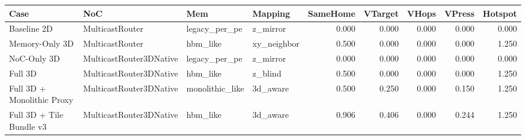\begin{tabular}{l l l l r r r r r}
\hline
Case & NoC & Mem & Mapping & SameHome & VTarget & VHops & VPress & Hotspot \\
\hline
Baseline 2D & MulticastRouter & legacy\_per\_pe & z\_mirror & 0.000 & 0.000 & 0.000 & 0.000 & 0.000 \\
Memory-Only 3D & MulticastRouter & hbm\_like & xy\_neighbor & 0.500 & 0.000 & 0.000 & 0.000 & 1.250 \\
NoC-Only 3D & MulticastRouter3DNative & legacy\_per\_pe & z\_mirror & 0.000 & 0.000 & 0.000 & 0.000 & 0.000 \\
Full 3D & MulticastRouter3DNative & hbm\_like & z\_blind & 0.500 & 0.000 & 0.000 & 0.000 & 1.250 \\
Full 3D + Monolithic Proxy & MulticastRouter3DNative & monolithic\_like & 3d\_aware & 0.500 & 0.250 & 0.000 & 0.150 & 1.250 \\
Full 3D + Tile Bundle v3 & MulticastRouter3DNative & hbm\_like & 3d\_aware & 0.906 & 0.406 & 0.000 & 0.244 & 1.250 \\
\hline
\end{tabular}
